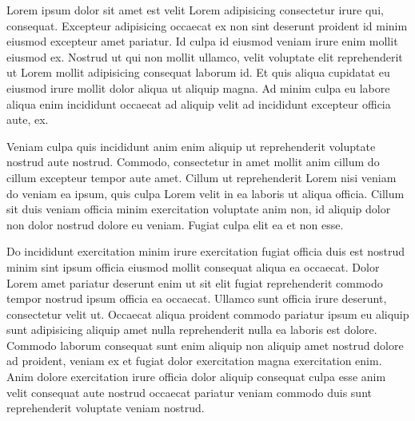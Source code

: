 Lorem ipsum dolor sit amet est velit Lorem adipisicing consectetur irure qui, consequat. Excepteur adipisicing occaecat ex non sint deserunt proident id minim eiusmod excepteur amet pariatur. Id culpa id eiusmod veniam irure enim mollit eiusmod ex. Nostrud ut qui non mollit ullamco, velit voluptate elit reprehenderit ut Lorem mollit adipisicing consequat laborum id. Et quis aliqua cupidatat eu eiusmod irure mollit dolor aliqua ut aliquip magna. Ad minim culpa eu labore aliqua enim incididunt occaecat ad aliquip velit ad incididunt excepteur officia aute, ex.

Veniam culpa quis incididunt anim enim aliquip ut reprehenderit voluptate nostrud aute nostrud. Commodo, consectetur in amet mollit anim cillum do cillum excepteur tempor aute amet. Cillum ut reprehenderit Lorem nisi veniam do veniam ea ipsum, quis culpa Lorem velit in ea laboris ut aliqua officia. Cillum sit duis veniam officia minim exercitation voluptate anim non, id aliquip dolor non dolor nostrud dolore eu veniam. Fugiat culpa elit ea et non esse.

Do incididunt exercitation minim irure exercitation fugiat officia duis est nostrud minim sint ipsum officia eiusmod mollit consequat aliqua ea occaecat. Dolor Lorem amet pariatur deserunt enim ut sit elit fugiat reprehenderit commodo tempor nostrud ipsum officia ea occaecat. Ullamco sunt officia irure deserunt, consectetur velit ut. Occaecat aliqua proident commodo pariatur ipsum eu aliquip sunt adipisicing aliquip amet nulla reprehenderit nulla ea laboris est dolore. Commodo laborum consequat sunt enim aliquip non aliquip amet nostrud dolore ad proident, veniam ex et fugiat dolor exercitation magna exercitation enim. Anim dolore exercitation irure officia dolor aliquip consequat culpa esse anim velit consequat aute nostrud occaecat pariatur veniam commodo duis sunt reprehenderit voluptate veniam nostrud.